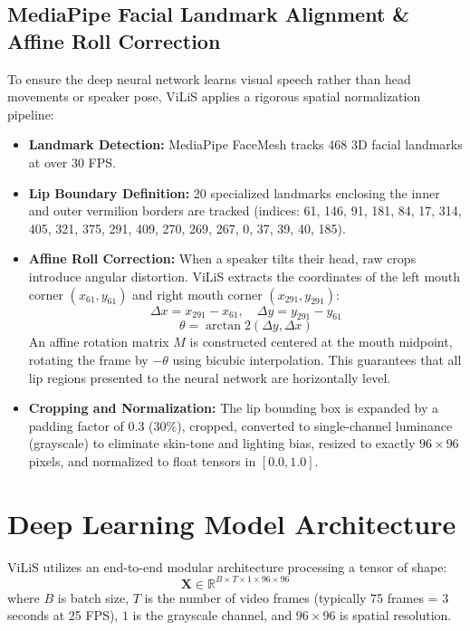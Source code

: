 \documentclass[11pt,a4paper]{article}
\begin{document}
\subsection{MediaPipe Facial Landmark Alignment \& Affine Roll Correction}
To ensure the deep neural network learns visual speech rather than head movements or speaker pose, ViLiS applies a rigorous spatial normalization pipeline:
\begin{itemize}
    \item \textbf{Landmark Detection:} MediaPipe FaceMesh tracks 468 3D facial landmarks at over 30 FPS.
    \item \textbf{Lip Boundary Definition:} 20 specialized landmarks enclosing the inner and outer vermilion borders are tracked (indices: 61, 146, 91, 181, 84, 17, 314, 405, 321, 375, 291, 409, 270, 269, 267, 0, 37, 39, 40, 185).
    \item \textbf{Affine Roll Correction:} When a speaker tilts their head, raw crops introduce angular distortion. ViLiS extracts the coordinates of the left mouth corner $(x_{61}, y_{61})$ and right mouth corner $(x_{291}, y_{291})$:
    $$\Delta x = x_{291} - x_{61}, \quad \Delta y = y_{291} - y_{61}$$
    $$\theta = \arctan2(\Delta y, \Delta x)$$
    An affine rotation matrix $M$ is constructed centered at the mouth midpoint, rotating the frame by $-\theta$ using bicubic interpolation. This guarantees that all lip regions presented to the neural network are horizontally level.
    \item \textbf{Cropping and Normalization:} The lip bounding box is expanded by a padding factor of $0.3$ ($30\%$), cropped, converted to single-channel luminance (grayscale) to eliminate skin-tone and lighting bias, resized to exactly $96 \times 96$ pixels, and normalized to float tensors in $[0.0, 1.0]$.
\end{itemize}

\section{Deep Learning Model Architecture}
ViLiS utilizes an end-to-end modular architecture processing a tensor of shape:
$$\mathbf{X} \in \mathbb{R}^{B \times T \times 1 \times 96 \times 96}$$
where $B$ is batch size, $T$ is the number of video frames (typically 75 frames = 3 seconds at 25 FPS), $1$ is the grayscale channel, and $96 \times 96$ is spatial resolution.
\end{document}
